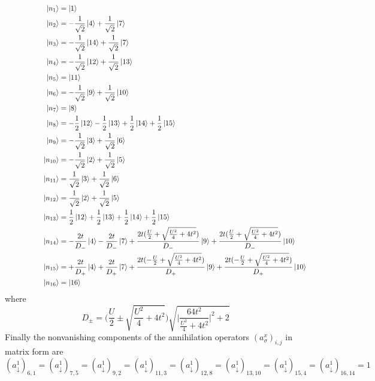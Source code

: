 \begin{align*}
	\ket{n_1}&= \ket{1}\hspace{2cm}\\
	\ket{n_2}&=-\frac{1}{\sqrt{2}} \ket{4} + \frac{1}{\sqrt{2}}\ket{7} \hspace{2cm}\\
	\ket{n_3}&=-\frac{1}{\sqrt{2}} \ket{14} + \frac{1}{\sqrt{2}}\ket{7}\\
	\ket{n_4}&=-\frac{1}{\sqrt{2}} \ket{12} + \frac{1}{\sqrt{2}}\ket{13}\\ \hspace{2cm}
	\ket{n_5}&=\ket{11} \\
	\ket{n_6}&=-\frac{1}{\sqrt{2}} \ket{9} + \frac{1}{\sqrt{2}}\ket{10}\\
	\ket{n_7}&= \ket{8} \\
	\ket{n_8}&=-\frac{1}{2} \ket{12} - \frac{1}{{2}}\ket{13}  + \frac{1}{{2}}\ket{14}  + \frac{1}{{2}}\ket{15}\\
	\ket{n_9}&=-\frac{1}{\sqrt{2}} \ket{3} + \frac{1}{\sqrt{2}}\ket{6}\\
	\ket{n_{10}}&=-\frac{1}{\sqrt{2}} \ket{2} + \frac{1}{\sqrt{2}}\ket{5}\\
	\ket{n_{11}}&=\frac{1}{\sqrt{2}} \ket{3} + \frac{1}{\sqrt{2}}\ket{6}\\
	\ket{n_{12}}&=\frac{1}{\sqrt{2}} \ket{2} + \frac{1}{\sqrt{2}}\ket{5}\\
	\ket{n_{13}}&=\frac{1}{2} \ket{12} + \frac{1}{{2}}\ket{13}  + \frac{1}{{2}}\ket{14}  + \frac{1}{{2}}\ket{15}\\
	\ket{n_{14}}&= -\frac{2t}{D_-} \ket{4} -\frac{2t}{D_-} \ket{7} +\frac{2t(\frac{U}{2}+\sqrt{\frac{U^2}{4}+4t^2})}{D_-} \ket{9} +\frac{2t(\frac{U}{2}+\sqrt{\frac{U^2}{4}+4t^2})}{D_-} \ket{10}\\
	\ket{n_{15}}&= +\frac{2t}{D_+} \ket{4} +\frac{2t}{D_+} \ket{7} +\frac{2t(-\frac{U}{2}+\sqrt{\frac{U^2}{4}+4t^2})}{D_+} \ket{9} +\frac{2t(-\frac{U}{2}+\sqrt{\frac{U^2}{4}+4t^2})}{D_+} \ket{10}\\
	\ket{n_{16}}&=\ket{16}
\end{align*}
where 
\begin{equation*}
	D_{\pm}= \biggl(\frac{U}{2}\pm\sqrt{\frac{U^2}{4}+4t^2}\biggr)\sqrt{\biggl|\frac{64t^2}{\frac{U^2}{4}+4t^2}\biggr|^2+2}
\end{equation*}
\clearpage
\noindent Finally the nonvanishing components of the annihilation operators $(a^{x}_\sigma)_{i,j}$ in matrix form are
\begin{equation*}
	(a^1_\downarrow)_{6,1}=(a^1_\downarrow)_{7,5}=(a^1_\downarrow)_{9,2}=(a^1_\downarrow)_{11,3}=(a^1_\downarrow)_{12,8}=(a^1_\downarrow)_{13,10}=(a^1_\downarrow)_{15,4}=(a^1_\downarrow)_{16,14}=1 
\end{equation*}
